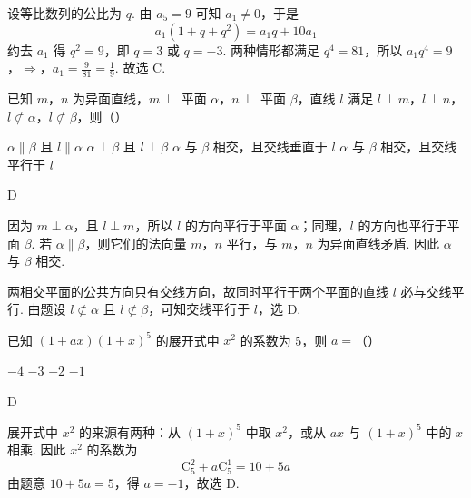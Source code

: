 \begin{solution}
设等比数列的公比为 \(q\). 由 \(a_5=9\) 可知 \(a_1\ne0\)，于是
\[
a_1(1+q+q^2)=a_1q+10a_1
\]
约去 \(a_1\) 得 \(q^2=9\)，即 \(q=3\) 或 \(q=-3\). 两种情形都满足 \(q^4=81\)，所以
\(a_1q^4=9\)，\(\Longrightarrow\)，\(a_1=\frac{9}{81}=\frac19\).
故选 C.
\end{solution}

\begin{problem}
已知 \(m\)，\(n\) 为异面直线，\(m \perp\) 平面 \(\alpha\)，\(n \perp\) 平面 \(\beta\)，直线 \(l\) 满足 \(l \perp m\)，\(l \perp n\)，\(l \not\subset \alpha\)，\(l \not\subset \beta\)，则（\quad）

\choices
    {\(\alpha \parallel \beta\) 且 \(l \parallel \alpha\)}
    {\(\alpha \perp \beta\) 且 \(l \perp \beta\)}
    {\(\alpha\) 与 \(\beta\) 相交，且交线垂直于 \(l\)}
    {\(\alpha\) 与 \(\beta\) 相交，且交线平行于 \(l\)}
\end{problem}

\begin{answer}
D
\end{answer}

\begin{solution}
因为 \(m\perp\alpha\)，且 \(l\perp m\)，所以 \(l\) 的方向平行于平面 \(\alpha\)；同理，\(l\) 的方向也平行于平面 \(\beta\). 若 \(\alpha\parallel\beta\)，则它们的法向量 \(m\)，\(n\) 平行，与 \(m\)，\(n\) 为异面直线矛盾. 因此 \(\alpha\) 与 \(\beta\) 相交.

两相交平面的公共方向只有交线方向，故同时平行于两个平面的直线 \(l\) 必与交线平行. 由题设 \(l\not\subset\alpha\) 且 \(l\not\subset\beta\)，可知交线平行于 \(l\)，选 D.
\end{solution}

\begin{problem}
已知 \((1 + ax)(1 + x)^5\) 的展开式中 \(x^2\) 的系数为 5，则 \(a =\)（\quad）

\choices
    {\(-4\)}
    {\(-3\)}
    {\(-2\)}
    {\(-1\)}
\end{problem}

\begin{answer}
D
\end{answer}

\begin{solution}
展开式中 \(x^2\) 的来源有两种：从 \((1+x)^5\) 中取 \(x^2\)，或从 \(ax\) 与 \((1+x)^5\) 中的 \(x\) 相乘. 因此 \(x^2\) 的系数为
\[
\mathrm C_5^2+a\mathrm C_5^1=10+5a
\]
由题意 \(10+5a=5\)，得 \(a=-1\)，故选 D.
\end{solution}

